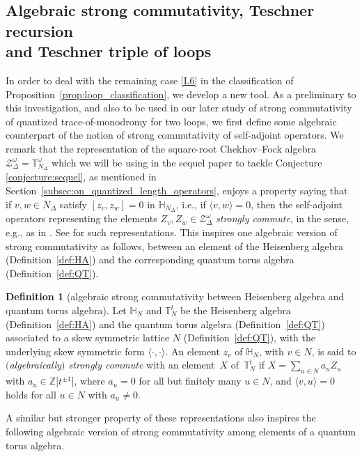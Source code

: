 \documentclass[pdftex]{sigma}
\numberwithin{equation}{section}
\theoremstyle{definition}
\newtheorem{Definition}[Theorem]{Definition}
\begin{document}
\subsection[Algebraic strong commutativity, Teschner recursion and Teschner triple of loops]{Algebraic strong commutativity, Teschner recursion\\ and Teschner triple of loops}
\label{subsec:Teschner_recursion}
In order to deal with the remaining case \ref{L6} in the classification of Proposition~\ref{prop:loop_classification}, we develop a new tool.
As a preliminary to this investigation, and also to be used in our later study of strong commutativity of quantized trace-of-monodromy for two loops, we first define some algebraic counterpart of the notion of strong commutativity of self-adjoint operators.
We remark that the representation of the square-root Chekhov--Fock algebra $\mathcal{Z}^\omega_\Delta = \mathbb{T}^\omega_{N_\Delta}$ which we will be using in the sequel paper \cite{sequel} to tackle Conjecture \ref{conjecture:sequel}, as mentioned in Section~\ref{subsec:on_quantized_length_operators}, enjoys a property saying that if $v,w\in N_\Delta$ satisfy $[z_v, z_w] =0$ in $\mathbb{H}_{N_\Delta}$, i.e., if $\langle v,w\rangle =0$, then the self-adjoint operators representing the elements $Z_v, Z_w \in \mathcal{Z}^\omega_\Delta$ {\em strongly commute}, in the sense, e.g., as in \cite[Section~VIII.5]{RS}. See \cite{FG09, Kim_irreducible} for such representations. This inspires one algebraic version of strong commutativity as follows, between an element of the Heisenberg algebra (Definition~\ref{def:HA}) and the corresponding quantum torus algebra (Definition~\ref{def:QT}).
\begin{Definition}[algebraic strong commutativity between Heisenberg algebra and quantum torus algebra]
\label{def:algebraic_SC1}
Let $\mathbb{H}_N$ and $\mathbb{T}^t_N$ be the Heisenberg algebra (Definition~\ref{def:HA}) and the quantum torus algebra (Definition~\ref{def:QT}) associated to a skew symmetric lattice $N$ (Definition~\ref{def:QT}), with the underlying skew symmetric form $\langle \cdot,\cdot \rangle$.
An element $z_v$ of $\mathbb{H}_N$, with $v\in N$, is said to {\em $($algebraically$)$ strongly commute} with an element~$X$ of~$\mathbb{T}^t_N$ if $X = \sum_{u \in N} a_u Z_u$ with $a_u \in \mathbb{Z}\bigl[t^{\pm 1}\bigr]$, where $a_u =0$ for all but finitely many $u\in N$, and $\langle v,u\rangle=0$ holds for all $u\in N$ with $a_u \neq0$.
\end{Definition}
A similar but stronger property of these representations also inspires the following algebraic version of strong commutativity among elements of a quantum torus algebra.
\end{document}
